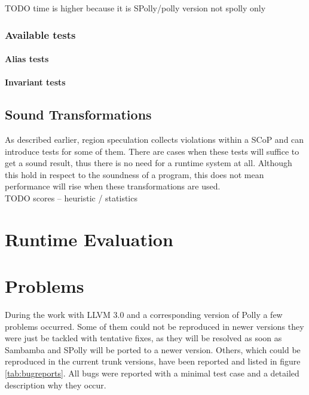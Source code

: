 TODO time is higher because it is SPolly/polly version not spolly only

\subsubsection{Available tests}

\paragraph{Alias tests}


\paragraph{Invariant tests}




\subsection{Sound Transformations}
\label{soundCTtransformations}
As described earlier, region speculation collects violations within a SCoP 
and can introduce tests for some of them. There are cases when these tests will
suffice to get a sound result, thus there is no need for a runtime system at all.
Although this hold in respect to the soundness of a program, this does not mean 
performance will rise when these transformations are used.  \\
TODO scores -- heuristic / statistics 


\section{Runtime Evaluation}


\section{Problems}
During the work with LLVM 3.0 and a corresponding version of Polly a few
problems occurred. Some of them could not be reproduced in newer versions
they were just be tackled with tentative fixes, as they will be resolved as soon
as Sambamba and SPolly will be ported to a newer version.
Others, which could be reproduced in the current trunk versions,
have been reported and listed in figure \ref{tab:bugreports}. All bugs were 
reported with a minimal test case and a detailed description why they occur.

